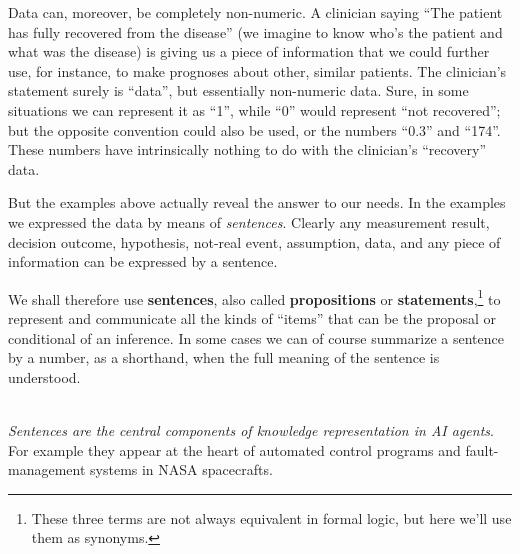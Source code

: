 \documentclass[
  a4paper,
  DIV=11,
  numbers=noendperiod,
  oneside]{scrreprt}
\begin{document}
Data can, moreover, be completely non-numeric. A clinician saying ``The
patient has fully recovered from the disease'' (we imagine to know who's
the patient and what was the disease) is giving us a piece of
information that we could further use, for instance, to make prognoses
about other, similar patients. The clinician's statement surely is
``data'', but essentially non-numeric data. Sure, in some situations we
can represent it as ``1'', while ``0'' would represent ``not
recovered''; but the opposite convention could also be used, or the
numbers ``0.3'' and ``174''. These numbers have intrinsically nothing to
do with the clinician's ``recovery'' data.

But the examples above actually reveal the answer to our needs. In the
examples we expressed the data by means of \emph{sentences}. Clearly any
measurement result, decision outcome, hypothesis, not-real event,
assumption, data, and any piece of information can be expressed by a
sentence.

We shall therefore use {\textbf{sentences}}, also called
{\textbf{propositions}} or \textbf{statements},\footnote{These three
  terms are not always equivalent in formal logic, but here we'll use
  them as synonyms.} to represent and communicate all the kinds of
``items'' that can be the proposal or conditional of an inference. In
some cases we can of course summarize a sentence by a number, as a
shorthand, when the full meaning of the sentence is understood.\\
\strut \\

\emph{Sentences are the central components of knowledge representation
in AI agents}. For example they appear at the heart of automated control
programs and fault-management systems in NASA spacecrafts.

\end{document}
